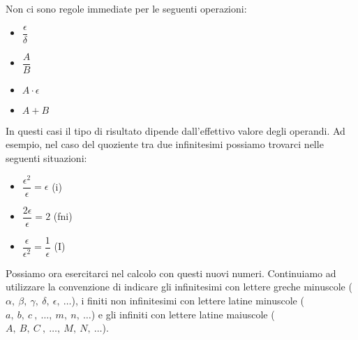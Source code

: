 \begin{osservazione}
Non ci sono regole immediate per le seguenti operazioni:
\begin{multicols}{4}
\begin{itemize} [nosep]
 \item \(\dfrac{\epsilon}{\delta}\)
 \item \(\dfrac{A}{B}\)
 \item \(A \cdot \epsilon\)
 \item \(A + B\)
\end{itemize}
\end{multicols}
In questi casi il tipo di risultato dipende dall'effettivo valore degli 
operandi. Ad esempio, nel caso del quoziente tra due infinitesimi possiamo 
trovarci nelle seguenti situazioni:
\begin{multicols}{3}
\begin{itemize} [nosep]
 \item \(\dfrac{\epsilon^2}{\epsilon} = \epsilon\) \quad (i)
 \item \(\dfrac{2\epsilon}{\epsilon} = 2\) \quad (fni)
 \item \(\dfrac{\epsilon}{\epsilon^2} = \dfrac{1}{\epsilon}\) \quad (I)
\end{itemize}
\end{multicols}
\end{osservazione}

Possiamo ora esercitarci nel calcolo con questi nuovi numeri. 
Continuiamo ad utilizzare la convenzione di indicare gli 
infinitesimi con lettere greche minuscole
(\(\alpha,~\beta,~\gamma,~\delta,~\epsilon,~\dots\)), 
i finiti non infinitesimi con lettere latine minuscole 
(\(a,~b,~c~,~\dots,~m,~n,~\dots\)) 
e gli infiniti con lettere latine maiuscole 
(\(A,~B,~C~,~\dots,~M,~N,~\dots\)).


